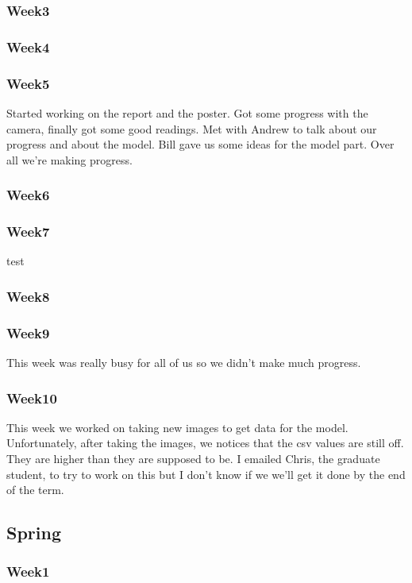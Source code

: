\subsubsection*{Week3}
	
\subsubsection*{Week4}

\subsubsection*{Week5}
	Started working on the report and the poster. Got some progress with the camera, finally got some good readings. Met with Andrew to talk about our progress and about the model. Bill gave us some ideas for the model part. Over all we're making progress. 
\subsubsection*{Week6}
\subsubsection*{Week7}
test
\subsubsection*{Week8}
\subsubsection*{Week9}
	This week was really busy for all of us so we didn't make much progress.
\subsubsection*{Week10}
	This week we worked on taking new images to get data for the model. Unfortunately, after taking the images, we notices that the csv values are still off. They are higher than they are supposed to be. I emailed Chris, the graduate student, to try to work on this but I don't know if we we'll get it done by the end of the term. 
	
\subsection*{Spring}

\subsubsection*{Week1}
	

